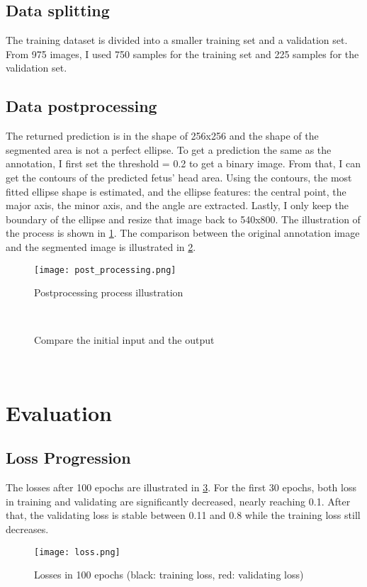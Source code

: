 \documentclass[conference]{article}
\begin{document}
\subsection{Data splitting}
The training dataset is divided into a smaller training set and a validation set. From 975 images, I used 750 samples for the training set and 225 samples for the validation set.

\subsection{Data postprocessing}
The returned prediction is in the shape of 256x256 and the shape of the segmented area is not a perfect ellipse. To get a prediction the same as the annotation, I first set the threshold = 0.2 to get a binary image. From that, I can get the contours of the predicted fetus' head area. Using the contours, the most fitted ellipse shape is estimated, and the ellipse features: the central point, the major axis, the minor axis, and the angle are extracted. Lastly, I only keep the boundary of the ellipse and resize that image back to 540x800. The illustration of the process is shown in \ref{fig:post_processing}. The comparison between the original annotation image and the segmented image is illustrated in \ref{fig:compare}.
\begin{figure}[hbt!]
    \centering
    \texttt{[image: post\_processing.png]}
    \caption{Postprocessing process illustration}
    \label{fig:post_processing}
\end{figure}
\mbox{}\\

\begin{figure}[hbt!]%
    \centering
    \qquad
    \caption{Compare the initial input and the output}%
    \label{fig:compare}%
\end{figure}
\mbox{}\\

\section{Evaluation}
\subsection{Loss Progression}
The losses after 100 epochs are illustrated in \ref{fig:loss}. For the first 30 epochs, both loss in training and validating are significantly decreased, nearly reaching 0.1. After that, the validating loss is stable between 0.11 and 0.8 while the training loss still decreases.
\begin{figure}[hbt!]
    \centering
    \texttt{[image: loss.png]}
    \caption{Losses in 100 epochs (black: training loss, red: validating loss)}
    \label{fig:loss}
\end{figure}
\end{document}
